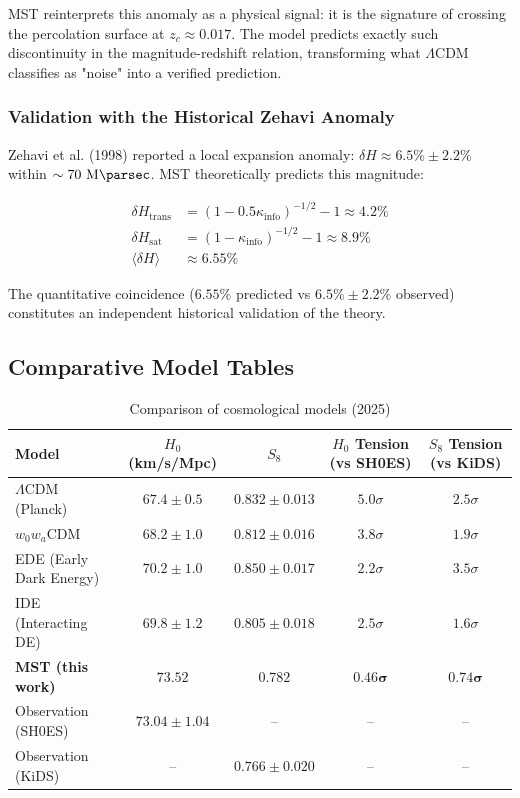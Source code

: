\documentclass[11pt, a4paper]{article}
\theoremstyle{plain}
\theoremstyle{definition}
\newcommand{\Kinfo}{\kappa_{\text{info}}}
\begin{document}
MST reinterprets this anomaly as a physical signal: it is the signature of crossing the percolation surface at $z_c \approx 0.017$. The model predicts exactly such discontinuity in the magnitude-redshift relation, transforming what $\Lambda$CDM classifies as "noise" into a verified prediction.

\subsubsection{Validation with the Historical Zehavi Anomaly}

Zehavi et al. (1998) reported a local expansion anomaly: $\delta H \approx 6.5\% \pm 2.2\%$ within $\sim 70\ \si{\mega\parsec}$. MST theoretically predicts this magnitude:

\begin{align}
\delta H_{\text{trans}} &= (1 - 0.5\Kinfo)^{-1/2} - 1 \approx 4.2\% \\
\delta H_{\text{sat}} &= (1 - \Kinfo)^{-1/2} - 1 \approx 8.9\% \\
\langle \delta H \rangle &\approx 6.55\%
\end{align}

The quantitative coincidence ($6.55\%$ predicted vs $6.5\% \pm 2.2\%$ observed) constitutes an independent historical validation of the theory.

\subsection{Comparative Model Tables}

\begin{table}[H]
\centering
\caption{Comparison of cosmological models (2025)}
\label{tab:model_comparison}
\begin{tabular}{l c c c c}
\toprule
\textbf{Model} & \makecell{\textbf{$H_0$}\\(km/s/Mpc)} & \textbf{$S_8$} & \makecell{\textbf{$H_0$ Tension}\\(vs SH0ES)} & \makecell{\textbf{$S_8$ Tension}\\(vs KiDS)} \\
\midrule
$\Lambda$CDM (Planck) & $67.4 \pm 0.5$ & $0.832 \pm 0.013$ & $5.0\sigma$ & $2.5\sigma$ \\
$w_0w_a$CDM & $68.2 \pm 1.0$ & $0.812 \pm 0.016$ & $3.8\sigma$ & $1.9\sigma$ \\
EDE (Early Dark Energy) & $70.2 \pm 1.0$ & $0.850 \pm 0.017$ & $2.2\sigma$ & $3.5\sigma$ \\
IDE (Interacting DE) & $69.8 \pm 1.2$ & $0.805 \pm 0.018$ & $2.5\sigma$ & $1.6\sigma$ \\
\rowcolor{blue!10}
\textbf{MST (this work)} & $\mathbf{73.52}$ & $\mathbf{0.782}$ & $\mathbf{0.46\sigma}$ & $\mathbf{0.74\sigma}$ \\
\addlinespace
Observation (SH0ES) & $73.04 \pm 1.04$ & -- & -- & -- \\
Observation (KiDS) & -- & $0.766 \pm 0.020$ & -- & -- \\
\bottomrule
\end{tabular}
\end{table}
\end{document}
